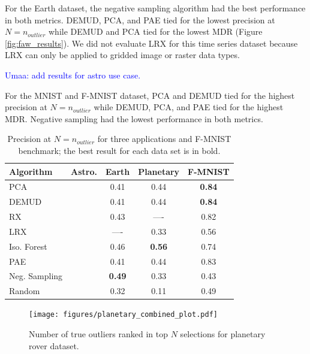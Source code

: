 \documentclass[letterpaper]{article} %
\newcommand{\todo}[1]{\textcolor{blue}{#1}}
\begin{document}
For the Earth dataset, the negative sampling algorithm had the best performance
in both metrics. DEMUD, PCA, and PAE tied for the lowest precision at 
$N=n_{outlier}$ while DEMUD and PCA tied for the lowest
MDR (Figure \ref{fig:faw_results}). We did not evaluate LRX for this time 
series dataset because LRX can only be applied to gridded image or raster 
data types.

\todo{Umaa: add results for astro use case.}

For the MNIST and F-MNIST dataset, PCA and DEMUD tied for the highest
 precision at $N=n_{outlier}$
while DEMUD, PCA, and PAE tied for the highest MDR. Negative sampling had the 
lowest performance in both metrics. 

\begin{table}
  \caption{Precision at $N=n_{outlier}$ for three applications and F-MNIST
   benchmark; the best result for each data set is in bold.}
  \label{tab:faw_results}
  \centering
  \begin{tabular}{l|cccc}
    \hline
    Algorithm & Astro. & Earth & Planetary & F-MNIST \\
    \hline
    PCA               & & 0.41 & 0.44 & \textbf{0.84} \\
    DEMUD             & & 0.41 & 0.44 & \textbf{0.84} \\
    \hline
    RX                & & 0.43 & ---- & 0.82 \\
    LRX               & & ---- & 0.33 & 0.56 \\
    \hline
    Iso. Forest  & & 0.46 & \textbf{0.56} & 0.74 \\
    \hline
    PAE               & & 0.41 & 0.44 & 0.83 \\
    Neg. Sampling & & \textbf{0.49} & 0.33 & 0.43 \\
    \hline
    Random            & & 0.32 & 0.11 & 0.49 \\
    \hline
  \end{tabular}
\end{table}

\begin{figure}
    \centering
    \texttt{[image: figures/planetary\_combined\_plot.pdf]}
    \caption{Number of true outliers ranked in top $N$ selections for 
    planetary rover dataset.}
    \label{fig:planetary_results}
\end{figure}
\end{document}
